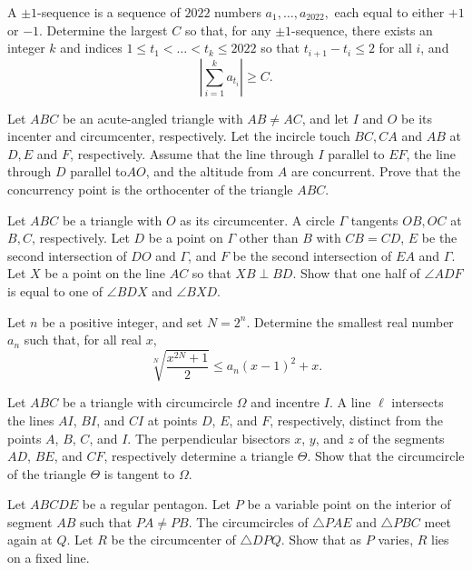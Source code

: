 \documentclass[11pt]{scrartcl}
\begin{document}
\begin{problem}[7948249970111159954]
	A $\pm 1$-sequence is a sequence of $2022$ numbers $a_1, \ldots, a_{2022},$ each equal to either $+1$ or $-1$. Determine the largest $C$ so that, for any $\pm 1$-sequence, there exists an integer $k$ and indices $1 \le t_1 < \ldots < t_k \le 2022$ so that $t_{i+1} - t_i \le 2$ for all $i$, and$$\left| \sum_{i = 1}^{k} a_{t_i} \right| \ge C.$$
\end{problem}
\begin{problem}[318208660266829737]
Let $ABC$ be an acute-angled triangle with $AB \ne AC$, and let $I$ and $O$ be its incenter and circumcenter, respectively. Let the incircle touch $BC, CA$ and $AB$ at $D, E$ and $F$, respectively. Assume that the line through $I$ parallel to $EF$, the line through $D$ parallel to$ AO$, and the altitude from $A$ are concurrent. Prove that the concurrency point is the orthocenter of the triangle $ABC$.
\end{problem}
\begin{problem}[537574018594693]
Let $ABC$ be a triangle with $O$ as its circumcenter. A circle $\Gamma$ tangents $OB, OC$ at $B, C$, respectively. Let $D$ be a point on $\Gamma$ other than $B$ with $CB=CD$, $E$ be the second intersection of $DO$ and $\Gamma$, and $F$ be the second intersection of $EA$ and $\Gamma$. Let $X$ be a point on the line $AC$ so that $XB\perp BD$. Show that one half of $\angle ADF$ is equal to one of $\angle BDX$ and $\angle BXD$.
\end{problem}
\begin{problem}[9026100911884959358]
Let $n$ be a positive integer, and set $N=2^{n}$. Determine the smallest real number $a_{n}$ such that, for all real $x$,
\[
\sqrt[N]{\frac{x^{2 N}+1}{2}} \leqslant a_{n}(x-1)^{2}+x .
\]
\end{problem}
\begin{problem}[719467452801051]
Let $ABC$ be a triangle with circumcircle $\Omega$ and incentre $I$. A line $\ell$ intersects the lines $AI$, $BI$, and $CI$ at points $D$, $E$, and $F$, respectively, distinct from the points $A$, $B$, $C$, and $I$. The perpendicular bisectors $x$, $y$, and $z$ of the segments $AD$, $BE$, and $CF$, respectively determine a triangle $\Theta$. Show that the circumcircle of the triangle $\Theta$ is tangent to $\Omega$.
\end{problem}
\begin{problem}[6020628633767269011]
Let \(ABCDE\) be a regular pentagon. Let \(P\) be a variable point on the interior of segment \(AB\) such that \(PA\ne PB\). The circumcircles of \(\triangle PAE\) and \(\triangle PBC\) meet again at \(Q\). Let \(R\) be the circumcenter of \(\triangle DPQ\). Show that as \(P\) varies, \(R\) lies on a fixed line.
\end{problem}
\end{document}
